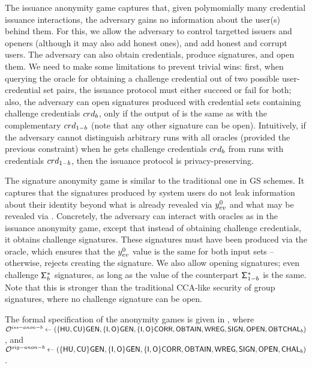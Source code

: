 The issuance anonymity game captures that, given polymomially many
credential issuance interactions, the adversary gains no information about the
user(s) behind them. For this, we allow the adversary to control targetted
issuers and openers (although it may also add honest ones), and add honest and
corrupt users. The adversary can also obtain credentials, produce signatures,
and open them. We need to make some limitations to prevent trivial wins: first,
when querying the oracle for obtaining a challenge credential out of two
possible user-credential set pairs, the issuance protocol must either succeed or
fail for both; also, the adversary can open signatures produced with credential
sets containing challenge credentials $crd_b$, only if the output of \Open is
the same as with the complementary $crd_{1-b}$ (note that any other signature
can be open).
Intuitively, if the adversary cannot distinguish arbitrary runs with all oracles
(provided the previous constraint) when he gets challenge credentials $crd_b$
from runs with credentials $crd_{1-b}$, then the issuance protocol is
privacy-preserving.

The signature anonymity game is similar to the traditional one in GS schemes.
It captures that the signatures produced by system users do not leak information
about their identity beyond what is already revealed via $y_{ev}^0$ and what
may be revealed via \yinsp. Concretely, the adversary can interact with oracles
as in the issuance anonymity game, except that instead of obtaining challenge
credentials, it obtains challenge signatures. These signatures must have been
produced via the \CHALb oracle, which ensures that the $y_{ev}^0$ value is the
same for both input sets -- otherwise, rejects creating the signature. We also
allow opening signatures; even challenge $\mathsf{\Sigma}^*_b$ signatures, as long as the
\yinsp value of the counterpart $\mathsf{\Sigma}^*_{1-b}$ is the same. Note that this is
stronger than the traditional CCA-like security of group signatures, where no
challenge signature can be open.

The formal specification of the anonymity games is given in
, where
$\mathcal{O}^{iss-anon-b} \gets (\lbrace\mathsf{HU},\mathsf{CU}\rbrace\mathsf{GEN},\lbrace\mathsf{I},\mathsf{O}\rbrace\mathsf{GEN},\lbrace\mathsf{I},
\mathsf{O}\rbrace\mathsf{CORR},\mathsf{OBTAIN},\mathsf{WREG},\mathsf{SIGN},\mathsf{OPEN},\mathsf{OBTCHAL}_b)$, and $\mathcal{O}^{sig-anon-b}
\gets (\lbrace\mathsf{HU},\mathsf{CU}\rbrace\mathsf{GEN},\lbrace\mathsf{I},\mathsf{O}\rbrace\mathsf{GEN},\lbrace\mathsf{I},\mathsf{O}\rbrace
\mathsf{CORR},\mathsf{OBTAIN},\mathsf{WREG},\mathsf{SIGN},\mathsf{OPEN},\mathsf{CHAL}_b)$.

